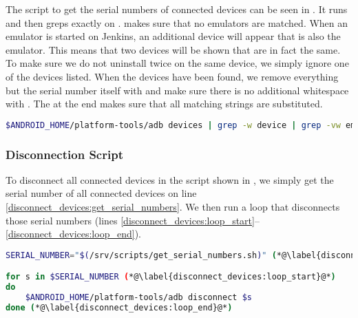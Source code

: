   The script to get the serial numbers of connected devices can be seen in . It runs  and then {grep}s exactly on .  makes sure that no emulators are matched. When an emulator is started on Jenkins, an additional device will appear that is also the emulator. This means that two devices will be shown that are in fact the same. To make sure we do not uninstall twice on the same device, we simply ignore one of the devices listed. When the devices have been found, we remove everything but the serial number itself with  and make sure there is no additional whitespace with . The  at the end makes sure that all matching strings are substituted.

  \begin{lstlisting}[language=bash,caption=Script that gets the serial numbers of all connected devices,label=lst:get_serial_numbers]
  $ANDROID_HOME/platform-tools/adb devices | grep -w device | grep -vw emulator | sed 's/\s*device//' | sed 's/\s*//g'
  \end{lstlisting}
\subsubsection{Disconnection Script}
To disconnect all connected devices in the script shown in , we simply get the serial number of all connected devices on line \ref{disconnect_devices:get_serial_numbers}. We then run a loop that disconnects those serial numbers (lines \ref{disconnect_devices:loop_start}--\ref{disconnect_devices:loop_end}).
  \begin{lstlisting}[language=bash,caption=Script that disconnects all connected devices,label=lst:disconnect_devices]
SERIAL_NUMBER="$(/srv/scripts/get_serial_numbers.sh)" (*@\label{disconnect_devices:get_serial_numbers}@*)

for s in $SERIAL_NUMBER (*@\label{disconnect_devices:loop_start}@*)
do
    $ANDROID_HOME/platform-tools/adb disconnect $s
done (*@\label{disconnect_devices:loop_end}@*)
  \end{lstlisting}